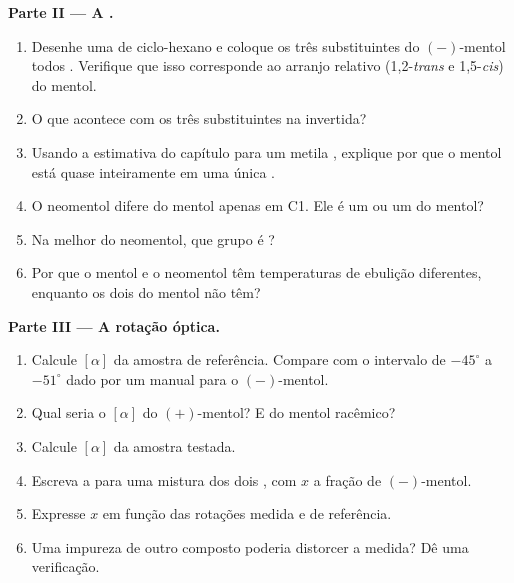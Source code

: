 \begin{problem}
\medskip
\noindent\textbf{Parte II --- A .}
\begin{enumerate}[resume]
  \item Desenhe uma  de ciclo-hexano e coloque os três
        substituintes do $(-)$-mentol todos . Verifique que isso
        corresponde ao arranjo relativo (1,2-\textit{trans} e
        1,5-\textit{cis}) do mentol.
  \item O que acontece com os três substituintes na  invertida?
  \item Usando a estimativa do capítulo para um metila , explique
        por que o mentol está quase inteiramente em uma única .
  \item O neomentol difere do mentol apenas em C1. Ele é um  ou
        um  do mentol?
  \item Na melhor  do neomentol, que grupo é ?
  \item Por que o mentol e o neomentol têm temperaturas de ebulição
        diferentes, enquanto os dois  do mentol não têm?
\end{enumerate}

\medskip
\noindent\textbf{Parte III --- A rotação óptica.}
\begin{enumerate}[resume]
  \item Calcule $[\alpha]$ da amostra de referência. Compare com o
        intervalo de $-45^\circ$ a $-51^\circ$ dado por um manual para o
        $(-)$-mentol.
  \item Qual seria o $[\alpha]$ do $(+)$-mentol? E do mentol racêmico?
  \item Calcule $[\alpha]$ da amostra testada.
  \item Escreva a  para uma mistura dos dois , com
        $x$ a fração de $(-)$-mentol.
  \item Expresse $x$ em função das rotações medida e de referência.
  \item Uma impureza  de outro composto poderia distorcer a medida?
        Dê uma verificação.
\end{enumerate}


\end{problem}

